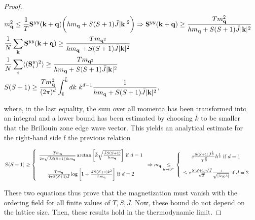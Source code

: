 \documentclass{homework}
\begin{document}
\begin{proof}
\begin{equation}\begin{split}
    &m_{\bf q}^2 \leq \frac{1}{T} {\bf S}^{yy}({\bf k + q}) \bigg( h m_{{\bf q}} + S(S+1) \bar{J} |{\bf k}|^2 \bigg) \Rightarrow {\bf S}^{yy}({\bf k + q}) \geq \frac{T m_{{\bf q}}^2}{h m_{{\bf q}} + S(S+1) \bar{J} |{\bf k}|^2 } \\
    &\frac{1}{N} \sum_{{\bf k}} {\bf S}^{yy}({\bf k + q}) \geq \frac{T m_{{\bf q}^2}}{h m_{{\bf q}} + S(S+1) \bar{J} |{\bf k}|^2 } \\
    & \frac{1}{N} \sum_{i} \langle ({\bf S}_i^y)^2 \rangle \geq \frac{T m_{{\bf q}^2}}{h m_{{\bf q}} + S(S+1) \bar{J} |{\bf k}|^2 } \\
    & S(S+1) \geq \frac{T m_{{\bf q}}^2}{(2\pi)^d} \int_{0}^{\bar{k}} dk \textnormal{ } k^{d-1} \frac{1}{h m_{{\bf q}} + S(S+1) \bar{J} |{\bf k}|^2},
\end{split}
\end{equation}

where, in the last equality, the sum over all momenta has been transformed into an integral and a lower bound has been estimated by choosing $\bar{k}$ to be smaller that the Brillouin zone edge wave vector. This yields an analytical estimate for the right-hand side f the previous relation

\begin{equation}
    S(S+1) \geq \left\{ \begin{array}{cc}
         \frac{Tm_{\bf q}}{2\pi \sqrt{\bar{J} S(S+1)) hm_{{\bf q}}}} \arctan \bigg[\bar{k} \sqrt{\frac{\bar{J}S(S+1)}{hm_{{\bf q}}}}\bigg] \textnormal{ if } d = 1\\
         \\
         \frac{Tm_{\bf q}}{4\pi S(S+1) \bar{J}} \log \bigg[1 +  \frac{\bar{J}S(S+1) {\bar{k}}^2}{hm_{{\bf q}}}\bigg] \textnormal{ if } d = 2 
    \end{array}\right. \Rightarrow m_{{\bf q}} \underset{h \rightarrow 0^+}{\leq} \left\{\begin{array}{cc}
         c \frac{S(S+1) \bar{J}^{\frac{1}{3}}}{T^{\frac{2}{3}}} h^{\frac{1}{3}} \textnormal{ if } d = 1 \\
         \\
         \leq c \frac{S(S+1) \sqrt{\bar{J}}}{\sqrt{T}} \frac{1}{\sqrt{|\log h|}} \textnormal{ if } d=2
    \end{array}\right.
\end{equation}

These two equations thus prove that the magnetization must vanish with the ordering field for all finite values of $T, S, \bar{J}$. Now, these bound do not depend on the lattice size. Then, these results hold in the thermodynamic limit. 
\end{proof}
\end{document}
